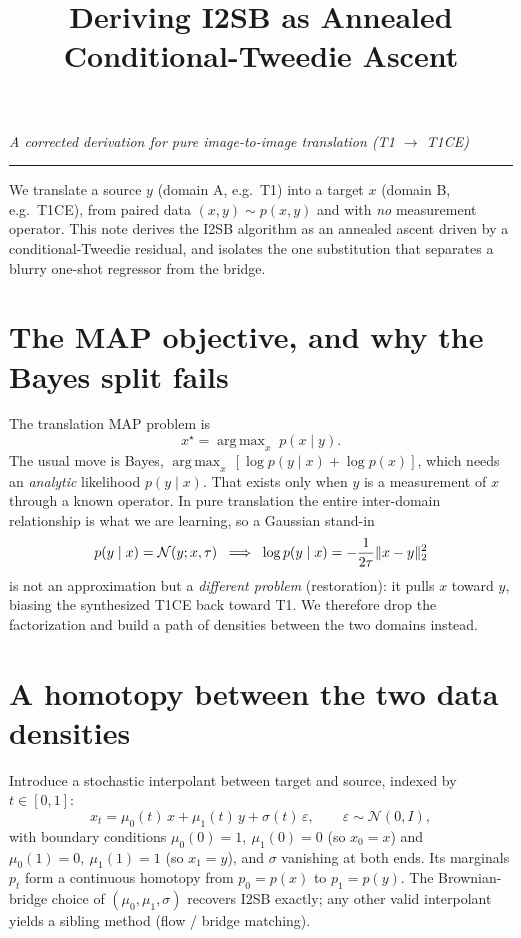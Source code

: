 \documentclass[11pt]{article}
\title{\vspace{-2em}Deriving I2SB as Annealed Conditional-Tweedie Ascent}
\author{}
\date{}
\DeclarePairedDelimiter{\norm}{\lVert}{\rVert}
\newcommand{\N}{\mathcal{N}}
\newcommand{\eps}{\varepsilon}
\DeclareMathOperator*{\argmax}{arg\,max}
\begin{document}
\maketitle
\vspace{-3em}
\begin{center}\itshape A corrected derivation for pure image-to-image translation
(T1 $\to$ T1CE)\end{center}
\vspace{0.5em}
\hrule
\vspace{1em}

We translate a source $y$ (domain A, e.g.\ T1) into a target $x$ (domain B, e.g.\ T1CE),
from paired data $(x,y)\sim p(x,y)$ and with \emph{no} measurement operator. This note
derives the I2SB algorithm as an annealed ascent driven by a conditional-Tweedie residual,
and isolates the one substitution that separates a blurry one-shot regressor from the bridge.

\section{The MAP objective, and why the Bayes split fails}
The translation MAP problem is
\begin{equation}
  x^\star = \argmax_x\; p(x \mid y).
\end{equation}
The usual move is Bayes, $\argmax_x\,[\log p(y\mid x) + \log p(x)]$, which needs an
\emph{analytic} likelihood $p(y\mid x)$. That exists only when $y$ is a measurement of $x$
through a known operator. In pure translation the entire inter-domain relationship is what
we are learning, so a Gaussian stand-in
\begin{equation}
  p(y\mid x) = \N(y; x, \tau)
  \;\;\Longrightarrow\;\;
  \log p(y\mid x) = -\frac{1}{2\tau}\norm{x-y}_2^2
\end{equation}
is not an approximation but a \emph{different problem} (restoration): it pulls $x$ toward
$y$, biasing the synthesized T1CE back toward T1. We therefore drop the factorization and
build a path of densities between the two domains instead.

\section{A homotopy between the two data densities}
Introduce a stochastic interpolant between target and source, indexed by $t\in[0,1]$:
\begin{equation}
  x_t = \mu_0(t)\,x + \mu_1(t)\,y + \sigma(t)\,\eps,
  \qquad \eps \sim \N(0, I),
\end{equation}
with boundary conditions $\mu_0(0)=1,\ \mu_1(0)=0$ (so $x_0=x$) and
$\mu_0(1)=0,\ \mu_1(1)=1$ (so $x_1=y$), and $\sigma$ vanishing at both ends. Its marginals
$p_t$ form a continuous homotopy from $p_0=p(x)$ to $p_1=p(y)$. The Brownian-bridge choice of
$(\mu_0,\mu_1,\sigma)$ recovers I2SB exactly; any other valid interpolant yields a sibling
method (flow / bridge matching).
\end{document}
